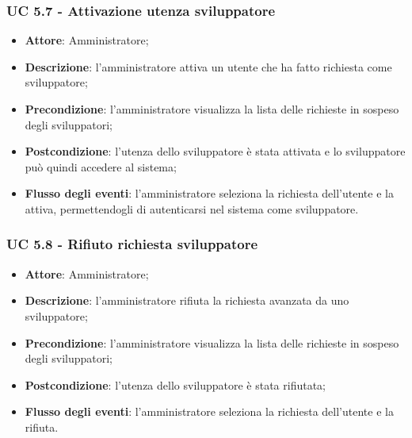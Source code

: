 \subsubsection{UC 5.7 - Attivazione utenza sviluppatore}
\begin{itemize}
\item \textbf{Attore}: Amministratore;
\item \textbf{Descrizione}: l'amministratore attiva un utente che ha fatto richiesta come sviluppatore;
\item \textbf{Precondizione}: l'amministratore visualizza la lista delle richieste in sospeso degli sviluppatori;
\item \textbf{Postcondizione}: l'utenza dello sviluppatore è stata attivata e lo sviluppatore può quindi accedere al sistema;
\item \textbf{Flusso degli eventi}: l'amministratore seleziona la richiesta dell'utente e la attiva, permettendogli di autenticarsi nel sistema come sviluppatore.
\end{itemize}

\subsubsection{UC 5.8 - Rifiuto richiesta sviluppatore}
\begin{itemize}
\item \textbf{Attore}: Amministratore;
\item \textbf{Descrizione}: l'amministratore rifiuta la richiesta avanzata da uno sviluppatore;
\item \textbf{Precondizione}: l'amministratore visualizza la lista delle richieste in sospeso degli sviluppatori;
\item \textbf{Postcondizione}: l'utenza dello sviluppatore è stata rifiutata;
\item \textbf{Flusso degli eventi}: l'amministratore seleziona la richiesta dell'utente e la rifiuta.
\end{itemize}



